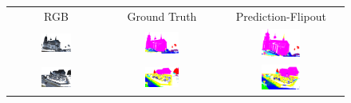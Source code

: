     \begin{figure}[h!]
        \begin{tabular}{ccc}
            RGB & Ground Truth & Prediction-Flipout \\
            \includegraphics[width=0.33\textwidth, height=0.18\textheight]{images/seg_output/sem3d_seg_output/1_RGB.png} &
            \includegraphics[width=0.33\textwidth, height=0.18\textheight]{images/seg_output/sem3d_seg_output/1_GT.png}& 
            \includegraphics[width=0.33\textwidth, height=0.18\textheight]{images/seg_output/flipout/sem3d_1.png}\\

            \includegraphics[width=0.33\textwidth, height=0.18\textheight]{images/seg_output/sem3d_seg_output/2_RGB.png} &
            \includegraphics[width=0.33\textwidth, height=0.18\textheight]{images/seg_output/sem3d_seg_output/2_GT.png}& 
            \includegraphics[width=0.33\textwidth, height=0.18\textheight]{images/seg_output/flipout/sem3d_2.png}\\


\end{tabular}
\end{figure}
